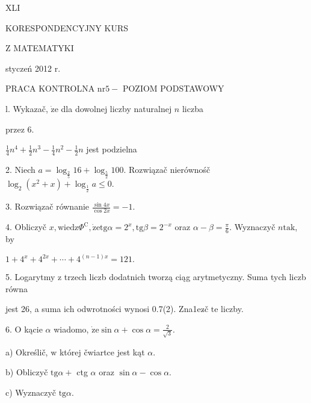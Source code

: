 \documentclass[a4paper,12pt]{article}
\begin{document}
XLI

KORESPONDENCYJNY KURS

Z MATEMATYKI

styczeń 2012 r.

PRACA KONTROLNA $\mathrm{n}\mathrm{r} 5-$ POZIOM PODSTAWOWY

l. Wykazač, $\dot{\mathrm{z}}\mathrm{e}$ dla dowolnej liczby naturalnej $n$ liczba

przez 6.

$\displaystyle \frac{1}{4}n^{4}+\frac{1}{2}n^{3}-\frac{1}{4}n^{2}-\frac{1}{2}n$ jest podzielna

2. Niech $a=\log_{\frac{2}{5}}16+\log_{\frac{5}{2}}100$. Rozwiązač nierównośč $\log_{2}(x^{2}+x)+\log_{\frac{1}{2}}a\leq 0.$

3. Rozwiązač równanie $\displaystyle \frac{\sin 4x}{\cos 2x}=-1.$

4. Obliczyč $x, \mathrm{w}\mathrm{i}\mathrm{e}\mathrm{d}\mathrm{z}\Phi^{\mathrm{C}}, \dot{\mathrm{z}}\mathrm{e}\mathrm{t}\mathrm{g}\alpha = 2^{x}, \mathrm{t}\mathrm{g}\beta= 2^{-x}$ oraz $\alpha-\beta= \displaystyle \frac{\pi}{6}$. Wyznaczyč $n\mathrm{t}\mathrm{a}\mathrm{k}$, by

$1+4^{x}+4^{2x}+\cdots+4^{(n-1)x}=121.$

5. Logarytmy $\mathrm{z}$ trzech liczb dodatnich tworzą ciąg arytmetyczny. Suma tych liczb równa

jest 26, a suma ich odwrotności wynosi 0.7(2). Zna1ez$\acute{}$č $\mathrm{t}\mathrm{e}$ liczby.

6. $\mathrm{O}$ kącie $\alpha$ wiadomo, $\displaystyle \dot{\mathrm{z}}\mathrm{e}\sin\alpha+\cos\alpha=\frac{2}{\sqrt{3}}.$

a) Określič, $\mathrm{w}$ której čwiartce jest kąt $\alpha.$

b) Obliczyč $\mathrm{t}\mathrm{g}\alpha+$ ctg $\alpha$ oraz $\sin\alpha-\cos\alpha.$

c) Wyznaczyč $\mathrm{t}\mathrm{g}\alpha.$
\end{document}
